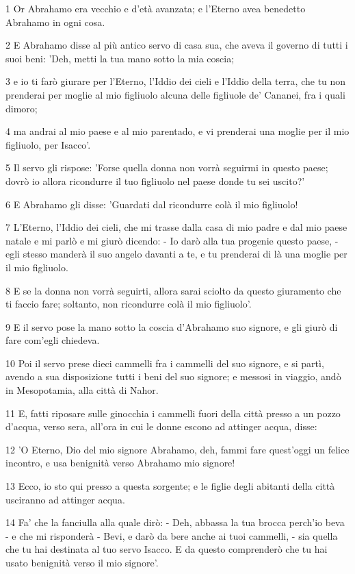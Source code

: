 \par 1 Or Abrahamo era vecchio e d'età avanzata; e l'Eterno avea benedetto Abrahamo in ogni cosa.
\par 2 E Abrahamo disse al più antico servo di casa sua, che aveva il governo di tutti i suoi beni: 'Deh, metti la tua mano sotto la mia coscia;
\par 3 e io ti farò giurare per l'Eterno, l'Iddio dei cieli e l'Iddio della terra, che tu non prenderai per moglie al mio figliuolo alcuna delle figliuole de' Cananei, fra i quali dimoro;
\par 4 ma andrai al mio paese e al mio parentado, e vi prenderai una moglie per il mio figliuolo, per Isacco'.
\par 5 Il servo gli rispose: 'Forse quella donna non vorrà seguirmi in questo paese; dovrò io allora ricondurre il tuo figliuolo nel paese donde tu sei uscito?'
\par 6 E Abrahamo gli disse: 'Guardati dal ricondurre colà il mio figliuolo!
\par 7 L'Eterno, l'Iddio dei cieli, che mi trasse dalla casa di mio padre e dal mio paese natale e mi parlò e mi giurò dicendo: - Io darò alla tua progenie questo paese, - egli stesso manderà il suo angelo davanti a te, e tu prenderai di là una moglie per il mio figliuolo.
\par 8 E se la donna non vorrà seguirti, allora sarai sciolto da questo giuramento che ti faccio fare; soltanto, non ricondurre colà il mio figliuolo'.
\par 9 E il servo pose la mano sotto la coscia d'Abrahamo suo signore, e gli giurò di fare com'egli chiedeva.
\par 10 Poi il servo prese dieci cammelli fra i cammelli del suo signore, e si partì, avendo a sua disposizione tutti i beni del suo signore; e messosi in viaggio, andò in Mesopotamia, alla città di Nahor.
\par 11 E, fatti riposare sulle ginocchia i cammelli fuori della città presso a un pozzo d'acqua, verso sera, all'ora in cui le donne escono ad attinger acqua, disse:
\par 12 'O Eterno, Dio del mio signore Abrahamo, deh, fammi fare quest'oggi un felice incontro, e usa benignità verso Abrahamo mio signore!
\par 13 Ecco, io sto qui presso a questa sorgente; e le figlie degli abitanti della città usciranno ad attinger acqua.
\par 14 Fa' che la fanciulla alla quale dirò: - Deh, abbassa la tua brocca perch'io beva - e che mi risponderà - Bevi, e darò da bere anche ai tuoi cammelli, - sia quella che tu hai destinata al tuo servo Isacco. E da questo comprenderò che tu hai usato benignità verso il mio signore'.
